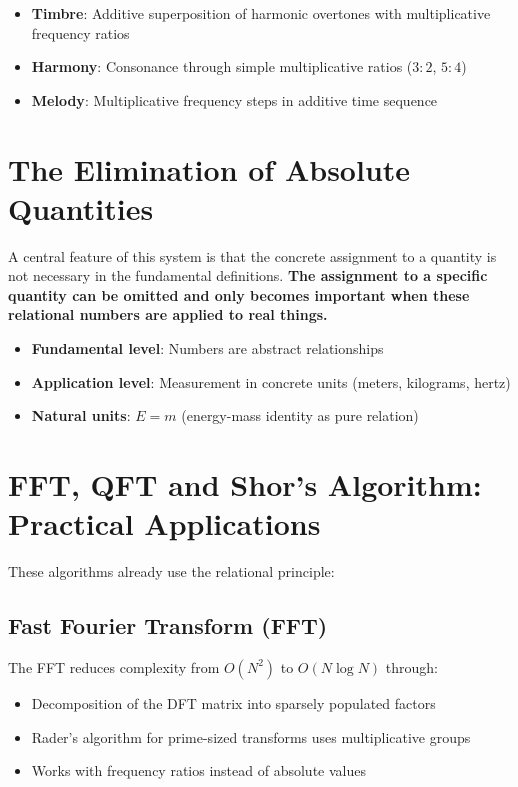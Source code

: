 	\begin{itemize}
		\item \textbf{Timbre}: Additive superposition of harmonic overtones with multiplicative frequency ratios
		\item \textbf{Harmony}: Consonance through simple multiplicative ratios ($3:2$, $5:4$)
		\item \textbf{Melody}: Multiplicative frequency steps in additive time sequence
	\end{itemize}
	
	\section{The Elimination of Absolute Quantities}
	
	A central feature of this system is that the concrete assignment to a quantity is not necessary in the fundamental definitions. \textbf{The assignment to a specific quantity can be omitted and only becomes important when these relational numbers are applied to real things.}
	
	\begin{definition}
		\begin{itemize}
			\item \textbf{Fundamental level}: Numbers are abstract relationships
			\item \textbf{Application level}: Measurement in concrete units (meters, kilograms, hertz)
			\item \textbf{Natural units}: $E = m$ (energy-mass identity as pure relation)
		\end{itemize}
	\end{definition}
	
	\section{FFT, QFT and Shor's Algorithm: Practical Applications}
	
	These algorithms already use the relational principle:
	
	\subsection{Fast Fourier Transform (FFT)}
	
	The FFT reduces complexity from $O(N^2)$ to $O(N \log N)$ through:
	\begin{itemize}
		\item Decomposition of the DFT matrix into sparsely populated factors
		\item Rader's algorithm for prime-sized transforms uses multiplicative groups
		\item Works with frequency ratios instead of absolute values
	\end{itemize}
	
